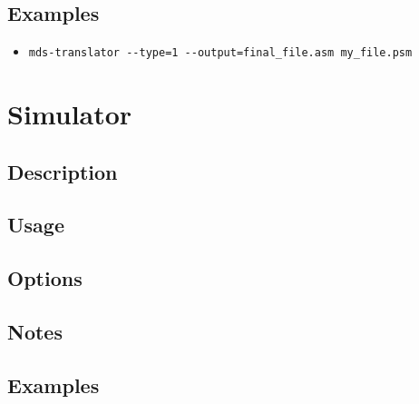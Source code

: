     \subsection{Examples}
        \begin{itemize}
            \item \verb'mds-translator --type=1 --output=final_file.asm my_file.psm'\\
        \end{itemize}

\section{Simulator}
    \subsection{Description}
    \subsection{Usage}
    \subsection{Options}
    \subsection{Notes}
    \subsection{Examples}
